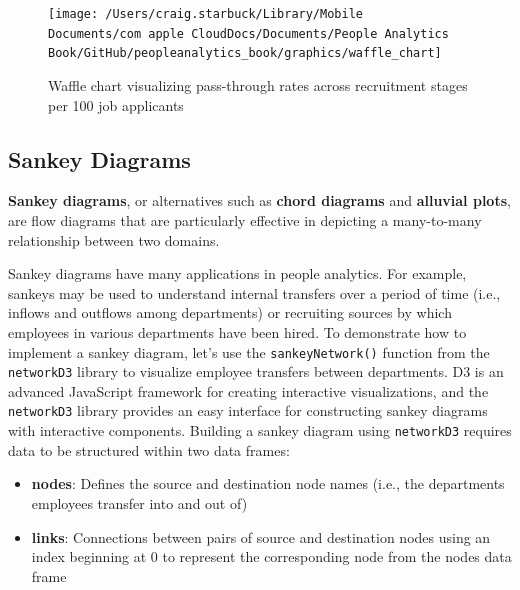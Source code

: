 \documentclass[
]{book}
\providecommand{\tightlist}{%
  \setlength{\itemsep}{0pt}\setlength{\parskip}{0pt}}
\begin{document}
\begin{figure}

{\centering \texttt{[image: /Users/craig.starbuck/Library/Mobile Documents/com~apple~CloudDocs/Documents/People Analytics Book/GitHub/peopleanalytics\_book/graphics/waffle\_chart]} 

}

\caption{Waffle chart visualizing pass-through rates across recruitment stages per 100 job applicants}\label{fig:waffle-chart}
\end{figure}

\hypertarget{sankey-diagrams}{%
\subsection{Sankey Diagrams}\label{sankey-diagrams}}

\textbf{Sankey diagrams}, or alternatives such as \textbf{chord diagrams} and \textbf{alluvial plots}, are flow diagrams that are particularly effective in depicting a many-to-many relationship between two domains.

Sankey diagrams have many applications in people analytics. For example, sankeys may be used to understand internal transfers over a period of time (i.e., inflows and outflows among departments) or recruiting sources by which employees in various departments have been hired.
To demonstrate how to implement a sankey diagram, let's use the \texttt{sankeyNetwork()} function from the \texttt{networkD3} library to visualize employee transfers between departments. D3 is an advanced JavaScript framework for creating interactive visualizations, and the \texttt{networkD3} library provides an easy interface for constructing sankey diagrams with interactive components. Building a sankey diagram using \texttt{networkD3} requires data to be structured within two data frames:

\begin{itemize}
\tightlist
\item
  \textbf{nodes}: Defines the source and destination node names (i.e., the departments employees transfer into and out of)
\item
  \textbf{links}: Connections between pairs of source and destination nodes using an index beginning at 0 to represent the corresponding node from the nodes data frame
\end{itemize}
\end{document}
